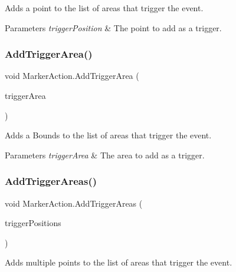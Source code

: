 Adds a point to the list of areas that trigger the event. 


\begin{DoxyParams}{Parameters}
{\em trigger\+Position} & The point to add as a trigger.\\
\hline
\end{DoxyParams}
\mbox{\label{class_marker_action_ac27e22f8368b62f303cee146b800b40a}} 
\subsubsection{\texorpdfstring{AddTriggerArea()}{AddTriggerArea()}\hspace{0.1cm}{\footnotesize\ttfamily [2/2]}}
{\footnotesize\ttfamily void Marker\+Action.\+Add\+Trigger\+Area (\begin{DoxyParamCaption}\item[{Bounds}]{trigger\+Area }\end{DoxyParamCaption})}



Adds a Bounds to the list of areas that trigger the event. 


\begin{DoxyParams}{Parameters}
{\em trigger\+Area} & The area to add as a trigger.\\
\hline
\end{DoxyParams}
\mbox{\label{class_marker_action_a68156ef1048821f016d27211cf46422f}} 
\subsubsection{\texorpdfstring{AddTriggerAreas()}{AddTriggerAreas()}\hspace{0.1cm}{\footnotesize\ttfamily [1/2]}}
{\footnotesize\ttfamily void Marker\+Action.\+Add\+Trigger\+Areas (\begin{DoxyParamCaption}\item[{I\+Enumerable$<$ Vector3 $>$}]{trigger\+Positions }\end{DoxyParamCaption})}



Adds multiple points to the list of areas that trigger the event. 


